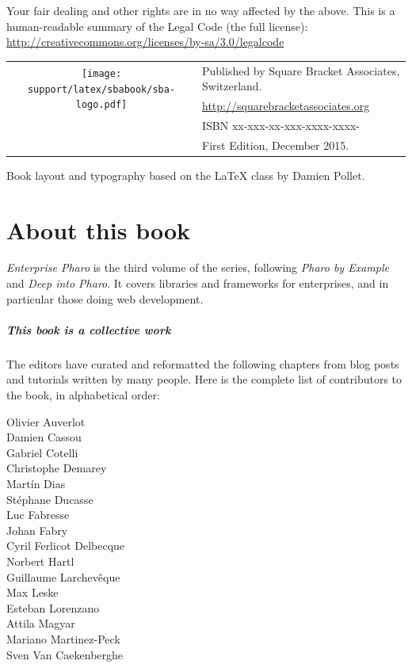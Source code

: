 \documentclass[10pt,twoside,english,showtrims]{support/latex/sbabook/sbabook}
\begin{document}
{  Your fair dealing and other rights are in no way affected by the
  above. This is a human-readable summary of the Legal Code (the full
  license): \\
  \url{http://creativecommons.org/licenses/by-sa/3.0/legalcode}

  \vfill

  \begin{tabular}{@{}c@{\quad}l}
    \multirow{2}{*}{\texttt{[image: support/latex/sbabook/sba-logo.pdf]}}
    & Published by Square Bracket Associates, Switzerland. \\
    & \url{http://squarebracketassociates.org} \\[\smallskipamount]
    & ISBN xx-xxx-xx-xxx-xxxx-xxxx- \\
    & First Edition, December 2015. \\
  \end{tabular}
  \medskip

  Book layout and typography based on the  \LaTeX{} class by Damien Pollet.
}


\frontmatter
\pagestyle{plain}


\chapter*{About this book}

\emph{Enterprise Pharo} is the third volume of the series, following \emph{Pharo
  by Example} and \emph{Deep into Pharo}. It covers libraries and frameworks for
enterprises, and in particular those doing web development.

\paragraph{This book is a collective work}
The editors have curated and reformatted the following chapters from blog posts
and tutorials written by many people. Here is the complete list of contributors
to the book, in alphabetical order:

\begin{multicols}{2}
Olivier Auverlot\\
Damien Cassou\\
Gabriel Cotelli\\
Christophe Demarey\\
Martín Dias\\
Stéphane Ducasse\\
Luc Fabresse\\
Johan Fabry\\
Cyril Ferlicot Delbecque\\
Norbert Hartl\\
Guillaume Larchevêque\\
Max Leske\\
Esteban Lorenzano\\
Attila Magyar\\
Mariano Martinez-Peck\\
Sven Van Caekenberghe\\
\end{multicols}
\end{document}
